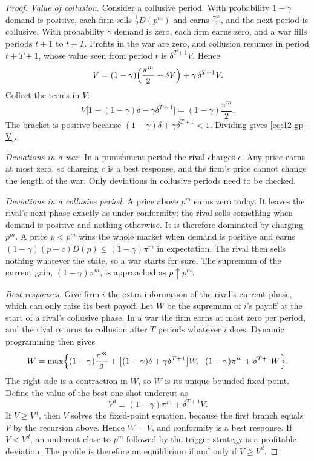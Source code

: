 \begin{proof}
\emph{Value of collusion.} Consider a collusive period. With probability $1 - \gamma$ demand is positive, each firm
sells $\frac{1}{2}D(p^m)$ and earns $\frac{\pi^m}{2}$, and the next period is collusive. With probability $\gamma$
demand is zero, each firm earns zero, and a war fills periods $t + 1$ to $t + T$. Profits in the war are zero, and
collusion resumes in period $t + T + 1$, whose value seen from period $t$ is $\delta^{T + 1}V$. Hence
\begin{equation*}
V = (1 - \gamma)\Bigl(\frac{\pi^m}{2} + \delta V\Bigr) + \gamma\,\delta^{T + 1}V .
\end{equation*}
Collect the terms in $V$:
\begin{equation*}
V\bigl[1 - (1 - \gamma)\delta - \gamma\delta^{T + 1}\bigr] = (1 - \gamma)\frac{\pi^m}{2} .
\end{equation*}
The bracket is positive because $(1 - \gamma)\delta + \gamma\delta^{T + 1} < 1$. Dividing gives \eqref{eq:12-gp-V}.

\emph{Deviations in a war.} In a punishment period the rival charges $c$. Any price earns at most zero, so charging
$c$ is a best response, and the firm's price cannot change the length of the war. Only deviations in collusive
periods need to be checked.

\emph{Deviations in a collusive period.} A price above $p^m$ earns zero today. It leaves the rival's next phase
exactly as under conformity: the rival sells something when demand is positive and nothing otherwise. It is
therefore dominated by charging $p^m$. A price $p < p^m$ wins the whole market when demand is positive and earns
$(1 - \gamma)(p - c)D(p) \le (1 - \gamma)\pi^m$ in expectation. The rival then sells nothing whatever the state, so
a war starts for sure. The supremum of the current gain, $(1 - \gamma)\pi^m$, is approached as $p \uparrow p^m$.

\emph{Best responses.} Give firm $i$ the extra information of the rival's current phase, which can only raise its
best payoff. Let $W$ be the supremum of $i$'s payoff at the start of a rival's collusive phase. In a war the firm
earns at most zero per period, and the rival returns to collusion after $T$ periods whatever $i$ does. Dynamic
programming then gives
\begin{equation*}
W = \max\Bigl\{(1 - \gamma)\frac{\pi^m}{2} + \bigl[(1 - \gamma)\delta + \gamma\delta^{T + 1}\bigr]W,\;\;
(1 - \gamma)\pi^m + \delta^{T + 1}W\Bigr\}.
\end{equation*}
The right side is a contraction in $W$, so $W$ is its unique bounded fixed point. Define the value of the best
one-shot undercut as
\begin{equation*}
V^d \equiv (1 - \gamma)\pi^m + \delta^{T + 1}V .
\end{equation*}
If $V \ge V^d$, then $V$ solves the fixed-point equation, because the first branch equals $V$ by the recursion
above. Hence $W = V$, and conformity is a best response. If $V < V^d$, an undercut close to $p^m$ followed by the
trigger strategy is a profitable deviation. The profile is therefore an equilibrium if and only if $V \ge V^d$.


\end{proof}
